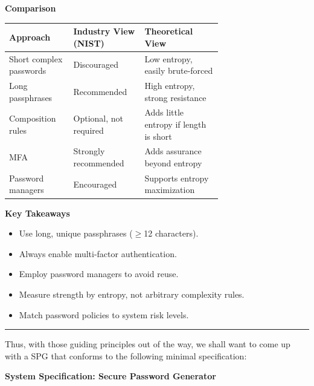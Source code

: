 \documentclass[a4paper, 18pt]{book} %
\begin{document}
{{{\vspace{1em}

\textbf{Comparison}
\begin{table}[H]
\normalsize
\centering
\begin{tabular}{| m{0.2\linewidth} | m{0.2\linewidth}| m{0.3\linewidth}|} %
\hline
\textbf{Approach} & \textbf{Industry View} (NIST) \cite{NIST2017} & \textbf{Theoretical View} \cite{Chowdhury2023,Burr2003} \\
\hline
Short complex passwords & Discouraged & Low entropy, easily brute-forced \\
\hline
Long passphrases & Recommended & High entropy, strong resistance \\
\hline
Composition rules & Optional, not required & Adds little entropy if length is short \\
\hline
MFA & Strongly recommended & Adds assurance beyond entropy \\
\hline
Password managers & Encouraged & Supports entropy maximization \\
\hline
\end{tabular}
\end{table}

\vspace{1em}

\textbf{Key Takeaways}
\begin{itemize}
  \item Use long, unique passphrases ($\geq$12 characters).
  \item Always enable multi-factor authentication.
  \item Employ password managers to avoid reuse.
  \item Measure strength by entropy, not arbitrary complexity rules.
  \item Match password policies to system risk levels.
\end{itemize}


\noindent\rule{\textwidth}{0.4pt}

\vspace{2em}


Thus, with those guiding principles out of the way, we shall want to come up with a SPG that conforms to the following minimal specification:

\vspace{2em}

\textbf{System Specification: Secure Password Generator}

}}}
\end{document}
